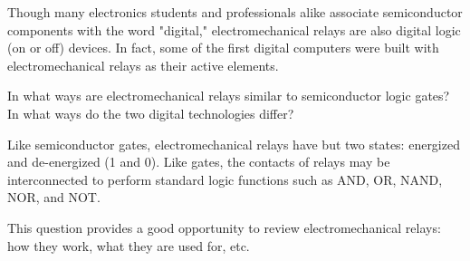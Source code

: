 

Though many electronics students and professionals alike associate semiconductor components with the word "digital," electromechanical relays are also digital logic (on or off) devices.  In fact, some of the first digital computers were built with electromechanical relays as their active elements.

In what ways are electromechanical relays similar to semiconductor logic gates?  In what ways do the two digital technologies differ?







Like semiconductor gates, electromechanical relays have but two states: energized and de-energized (1 and 0).  Like gates, the contacts of relays may be interconnected to perform standard logic functions such as AND, OR, NAND, NOR, and NOT.







This question provides a good opportunity to review electromechanical relays: how they work, what they are used for, etc.




